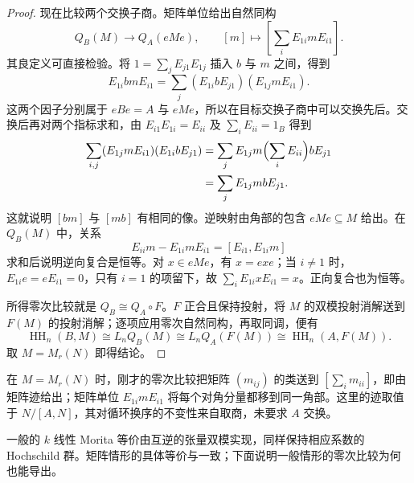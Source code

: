 \begin{proof}
	现在比较两个交换子商。矩阵单位给出自然同构
	\[
		Q_B(M)\longrightarrow Q_A(eMe),\qquad [m]\longmapsto\left[\sum_iE_{1i}mE_{i1}\right].
	\]
	其良定义可直接检验。将 \(1=\sum_jE_{j1}E_{1j}\) 插入 \(b\) 与 \(m\) 之间，得到
	\[
		E_{1i}bmE_{i1}=\sum_j(E_{1i}bE_{j1})(E_{1j}mE_{i1}).
	\]
	这两个因子分别属于 \(eBe=A\) 与 \(eMe\)，所以在目标交换子商中可以交换先后。交换后再对两个指标求和，由 \(E_{i1}E_{1i}=E_{ii}\) 及 \(\sum_iE_{ii}=1_B\) 得到
	\[
		\begin{aligned}
			\sum_{i,j}(E_{1j}mE_{i1})(E_{1i}bE_{j1}) &=\sum_jE_{1j}m\Bigl(\sum_iE_{ii}\Bigr)bE_{j1}\\
			&=\sum_jE_{1j}mbE_{j1}.
		\end{aligned}
	\]
	这就说明 \([bm]\) 与 \([mb]\) 有相同的像。逆映射由角部的包含 \(eMe\subseteq M\) 给出。在 \(Q_B(M)\) 中，关系
	\[
		E_{ii}m-E_{1i}mE_{i1}=[E_{i1},E_{1i}m]
	\]
	求和后说明逆向复合是恒等。对 \(x\in eMe\)，有 \(x=exe\)；当 \(i\ne1\) 时，\(E_{1i}e=eE_{i1}=0\)，只有 \(i=1\) 的项留下，故 \(\sum_iE_{1i}xE_{i1}=x\)。正向复合也为恒等。

	所得零次比较就是 \(Q_B\cong Q_A\circ F\)。\(F\) 正合且保持投射，将 \(M\) 的双模投射消解送到 \(F(M)\) 的投射消解；逐项应用零次自然同构，再取同调，便有
	\[
		\operatorname{HH}_n(B,M) \cong L_nQ_B(M) \cong L_nQ_A(F(M)) \cong\operatorname{HH}_n(A,F(M)).
	\]
	取 \(M=M_r(N)\) 即得结论。
\end{proof}

在 \(M=M_r(N)\) 时，刚才的零次比较把矩阵 \((m_{ij})\) 的类送到 \([\sum_i m_{ii}]\)，即由矩阵迹给出；矩阵单位 \(E_{1i}mE_{i1}\) 将每个对角分量都移到同一角部。这里的迹取值于 \(N/[A,N]\)，其对循环换序的不变性来自取商，未要求 \(A\) 交换。

\ProseParagraphBreak
一般的 \(k\) 线性 Morita 等价由互逆的张量双模实现，同样保持相应系数的 Hochschild 群。矩阵情形的具体等价与\cite[Proposition 9.5.2, Corollary 9.5.3]{Weibel1994HomologicalAlgebra}一致；下面说明一般情形的零次比较为何也能导出。

